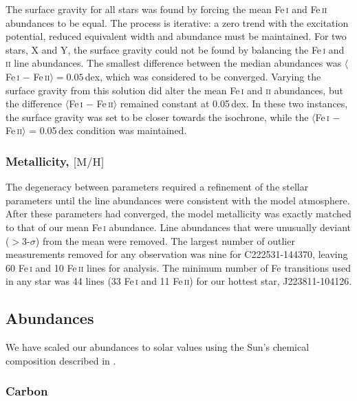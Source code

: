 \documentclass{emulateapj}
\begin{document}
The surface gravity for all stars was found by forcing the mean Fe\,\textsc{i} and Fe\,\textsc{ii} abundances to be equal. The process is iterative: a zero trend with the excitation potential, reduced equivalent width and abundance must be maintained. For two stars, X and Y, the surface gravity could not be found by balancing the Fe\,\textsc{i} and \textsc{ii} line abundances. The smallest difference between the median abundances was $\langle$Fe\,\textsc{i} $-$ Fe\,\textsc{ii}$\rangle = 0.05$\,dex, which was considered to be converged. Varying the surface gravity from this solution did alter the mean Fe\,\textsc{i} and \textsc{ii} abundances, but the difference $\langle$Fe\,\textsc{i} $-$ Fe\,\textsc{ii}$\rangle$ remained constant at 0.05\,dex. In these two instances, the surface gravity was set to be closer towards the isochrone, while the $\langle$Fe\,\textsc{i} $-$ Fe\,\textsc{ii}$\rangle$ = 0.05\,dex condition was maintained.


\subsubsection{Metallicity, $\mbox{[M/H]}$}
The degeneracy between parameters required a refinement of the stellar parameters until the line abundances were consistent with the model atmosphere. After these parameters had converged, the model metallicity was exactly matched to that of our mean Fe\,\textsc{i} abundance. Line abundances that were unusually deviant ($>$3-$\sigma$) from the mean were removed. The largest number of outlier measurements removed for any observation was nine for C222531-144370, leaving 60 Fe\,\textsc{i} and 10 Fe\,\textsc{ii} lines for analysis. The minimum number of Fe transitions used in any star was 44 lines (33 Fe\,\textsc{i} and 11 Fe\,\textsc{ii}) for our hottest star, J223811-104126.



\subsection{Abundances}
We have scaled our abundances to solar values using the Sun's chemical composition described in \citet{asplund;et-al_2009}.

\subsubsection{Carbon}
\end{document}
